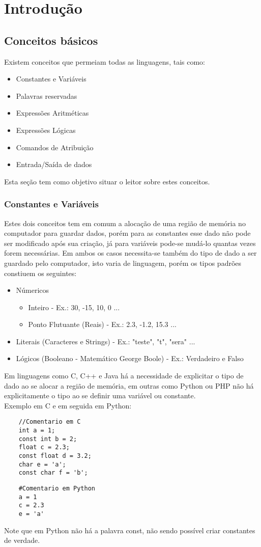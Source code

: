 \chapter{Introdução}
\section{Conceitos básicos}
Existem conceitos que permeiam todas as linguagens, tais como:
\begin{itemize}
    \item Constantes e Variáveis
    \item Palavras reservadas
    \item Expressões Aritméticas
    \item Expressões Lógicas
    \item Comandos de Atribuição
    \item Entrada/Saída de dados
\end{itemize}
Esta seção tem como objetivo situar o leitor sobre estes conceitos.
\subsection{Constantes e Variáveis}
Estes dois conceitos tem em comum a alocação de uma região de memória no computador para guardar dados, porém para as constantes esse dado não pode ser modificado após sua criação, já para variáveis pode-se mudá-lo quantas vezes forem necessárias. Em ambos os casos necessita-se também do tipo de dado a ser guardado pelo computador, isto varia de linguagem, porém os tipos padrões constiuem os seguintes:
\begin{itemize}
    \item Númericos
    \begin{itemize}
        \item Inteiro - Ex.: 30, -15, 10, 0 ...
        \item Ponto Flutuante (Reais) - Ex.: 2.3, -1.2, 15.3 ...
    \end{itemize}
    \item Literais (Caracteres e Strings) - Ex.: "teste", "t", "sera" ...
    \item Lógicos (Booleano - Matemático George Boole) - Ex.: Verdadeiro e Falso
\end{itemize}
Em linguagens como C, C++ e Java há a necessidade de explicitar o tipo de dado ao se alocar a região de memória, em outras como Python ou PHP não há explicitamente o tipo ao se definir uma variável ou constante. \\
Exemplo em C e em seguida em Python:
\begin{lstlisting}
    //Comentario em C
    int a = 1;
    const int b = 2;
    float c = 2.3;
    const float d = 3.2;
    char e = 'a';
    const char f = 'b';
\end{lstlisting}
\begin{lstlisting}
    #Comentario em Python
    a = 1
    c = 2.3
    e = 'a'
\end{lstlisting}
Note que em Python não há a palavra const, não sendo possível criar constantes de verdade.
